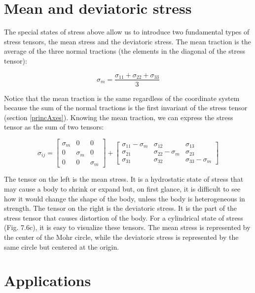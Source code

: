 \documentclass[a4paper , 12pt]{book}
\begin{document}
\section{Mean and deviatoric stress}\label{meanDevStress}

The special states of stress above allow us to introduce two fundamental types of stress tensors, the mean stress and the deviatoric stress. The mean traction is the average of the three normal tractions (the elements in the diagonal of the stress tensor):

\begin{equation}
    \sigma_m=\frac{\sigma_{11}+\sigma_{22}+\sigma_{33}}{3}
\end{equation}

Notice that the mean traction is the same regardless of the coordinate system because the sum of the normal tractions is the first invariant of the stress tensor (section \ref{princAxes}). Knowing the mean traction, we can express the stress tensor as the sum of two tensors:

\begin{equation}
    \sigma_{ij}=\left[\begin{array}{ccc}\sigma_m & 0 & 0 \\ 0 & \sigma_m & 0 \\ 0 & 0 & \sigma_m\end{array}\right]+\left[\begin{array}{ccc}\sigma_{11}-\sigma_m & \sigma_{12} & \sigma_{13} \\ \sigma_{21} & \sigma_{22}-\sigma_m & \sigma_{23} \\ \sigma_{31} & \sigma_{32} & \sigma_{33}-\sigma_m\end{array}\right]
\end{equation}

The tensor on the left is the mean stress. It is a hydrostatic state of stress that may cause a body to shrink or expand but, on first glance, it is difficult to see how it would change the shape of the body, unless the body is heterogeneous in strength. The tensor on the right is the deviatoric stress. It is the part of the stress tensor that causes distortion of the body. For a cylindrical state of stress (Fig. 7.6c), it is easy to visualize these tensors. The mean stress is represented by the center of the Mohr circle, while the deviatoric stress is represented by the same circle but centered at the origin.

\section{Applications}
\end{document}
